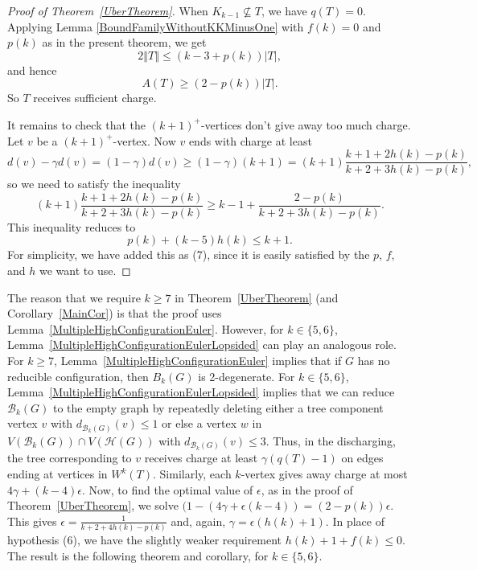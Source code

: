 \documentclass[12pt]{article}
\theoremstyle{plain}
\theoremstyle{definition}
\theoremstyle{remark}
\newcommand{\fancy}[1]{\mathcal{#1}}
\newcommand{\B}{\fancy{B}}
\newcommand{\HH}{\fancy{H}}
\newcommand{\card}[1]{\left|#1\right|}
\newcommand{\size}[1]{\left\Vert#1\right\Vert}
\begin{document}
\begin{proof}[Proof of Theorem~\ref{UberTheorem}]
When $K_{k-1} \not \subseteq T$, we have $q(T) = 0$.  Applying Lemma
\ref{BoundFamilyWithoutKKMinusOne} with $f(k) = 0$ and $p(k)$ as in the present
theorem, we get 
\[2\size{T} \le (k-3 + p(k))\card{T},\]
and hence
\[A(T) \ge (2-p(k))\card{T}.\]
So $T$ receives sufficient charge.

It remains to check that the $(k+1)^+$-vertices don't give away too much
charge.  Let $v$ be a $(k+1)^+$-vertex. Now $v$ ends with charge at least
%
\[d(v) - \gamma d(v) = (1-\gamma)d(v) \ge (1-\gamma)(k+1) = (k+1)\frac{k+1 +
2h(k) - p(k)}{k+2 + 3h(k) - p(k)},\]
%
so we need to satisfy the inequality
%
\[(k+1)\frac{k+1 + 2h(k) - p(k)}{k+2 + 3h(k) - p(k)} \ge k-1 +
\frac{2-p(k)}{k+2 + 3h(k) - p(k)}.\]
%
This inequality reduces to
%
\[p(k) + (k-5)h(k) \le k+1.\]
%
For simplicity, we have added this as (7), since it is easily satisfied by the
$p$, $f$, and $h$ we want to use.
\end{proof}

The reason that we require $k\ge 7$ in Theorem~\ref{UberTheorem} (and
Corollary~\ref{MainCor}) is that the proof uses
Lemma~\ref{MultipleHighConfigurationEuler}.  However, for $k\in\{5,6\}$,
Lemma~\ref{MultipleHighConfigurationEulerLopsided} can play an analogous role. 
For $k\ge 7$, Lemma~\ref{MultipleHighConfigurationEuler} implies that if $G$
has no reducible configuration, then $B_k(G)$ is 2-degenerate.  For
$k\in\{5,6\}$, Lemma~\ref{MultipleHighConfigurationEulerLopsided} implies that
we can reduce $\B_k(G)$ to the empty graph by repeatedly deleting either a tree
component vertex $v$ with $d_{\B_k(G)}(v)\le 1$ or else a vertex $w$ in
$V(\B_k(G))\cap V(\HH(G))$ with $d_{\B_k(G)}(v)\le 3$.  Thus, in the
discharging, the tree corresponding to $v$ receives charge at least
$\gamma(q(T)-1)$ on edges ending at vertices in $W^k(T)$.  Similarly, each
$k$-vertex gives away charge at most $4\gamma+(k-4)\epsilon$.  Now, to find the
optimal value of $\epsilon$, as in the proof of Theorem~\ref{UberTheorem}, we
solve $(1-(4\gamma+\epsilon(k-4))=(2-p(k))\epsilon$.  This gives $\epsilon =
\frac1{k+2+4h(k)-p(k)}$ and, again, $\gamma=\epsilon(h(k)+1)$.  In place of
hypothesis (6), we have the slightly weaker requirement $h(k)+1+f(k)\le 0$. 
The result is the following theorem and corollary, for $k\in\{5,6\}$.
\end{document}

